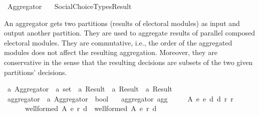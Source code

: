 %
\begin{isabellebody}%
%
%
\isadelimdocument
\isanewline
%
\endisadelimdocument
%
\isatagdocument
\isanewline
\isanewline
\isanewline
%
\isamarkuptrue%
%
\endisatagdocument
{\isafolddocument}%
%
\isadelimdocument
%
\endisadelimdocument
%
\isadelimtheory
%
\endisadelimtheory
%
\isatagtheory
{}\isamarkupfalse%
\ Aggregator\isanewline
\ \ \ {\isachardoublequoteopen}Social{\isacharunderscore}{\kern0pt}Choice{\isacharunderscore}{\kern0pt}Types{\isacharslash}{\kern0pt}Result{\isachardoublequoteclose}\isanewline
{}%
\endisatagtheory
{\isafoldtheory}%
%
\isadelimtheory
%
\endisadelimtheory
%
\begin{isamarkuptext}%
An aggregator gets two partitions (results of electoral modules) as input and
output another partition. They are used to aggregate results of parallel
composed electoral modules.
They are commutative, i.e., the order of the aggregated modules does not affect
the resulting aggregation. Moreover, they are conservative in the sense that
the resulting decisions are subsets of the two given partitions' decisions.%
\end{isamarkuptext}\isamarkuptrue%
%
\isadelimdocument
%
\endisadelimdocument
%
\isatagdocument
%
\isamarkuptrue%
%
\endisatagdocument
{\isafolddocument}%
%
\isadelimdocument
%
\endisadelimdocument
{}\isamarkupfalse%
\ {\isacharprime}{\kern0pt}a\ Aggregator\ {\isacharequal}{\kern0pt}\ {\isachardoublequoteopen}{\isacharprime}{\kern0pt}a\ set\ {\isasymRightarrow}\ {\isacharprime}{\kern0pt}a\ Result\ {\isasymRightarrow}\ {\isacharprime}{\kern0pt}a\ Result\ {\isasymRightarrow}\ {\isacharprime}{\kern0pt}a\ Result{\isachardoublequoteclose}\isanewline
\isanewline
{}\isamarkupfalse%
\ aggregator\ {\isacharcolon}{\kern0pt}{\isacharcolon}{\kern0pt}\ {\isachardoublequoteopen}{\isacharprime}{\kern0pt}a\ Aggregator\ {\isasymRightarrow}\ bool{\isachardoublequoteclose}\ \isanewline
\ \ {\isachardoublequoteopen}aggregator\ agg\ {\isasymequiv}\isanewline
\ \ \ \ {\isasymforall}A\ e{}\ e{}\ d{}\ d{}\ r{}\ r{}{\isachardot}{\kern0pt}\isanewline
\ \ \ \ \ \ {\isacharparenleft}{\kern0pt}well{\isacharunderscore}{\kern0pt}formed\ A\ {\isacharparenleft}{\kern0pt}e{}{\isacharcomma}{\kern0pt}\ r{}{\isacharcomma}{\kern0pt}\ d{}{\isacharparenright}{\kern0pt}\ {\isasymand}\ well{\isacharunderscore}{\kern0pt}formed\ A\ {\isacharparenleft}{\kern0pt}e{}{\isacharcomma}{\kern0pt}\ r{}{\isacharcomma}{\kern0pt}\ d{}{\isacharparenright}{\kern0pt}{\isacharparenright}{\kern0pt}\ {\isasymlongrightarrow}\isanewline

\end{isabellebody}
